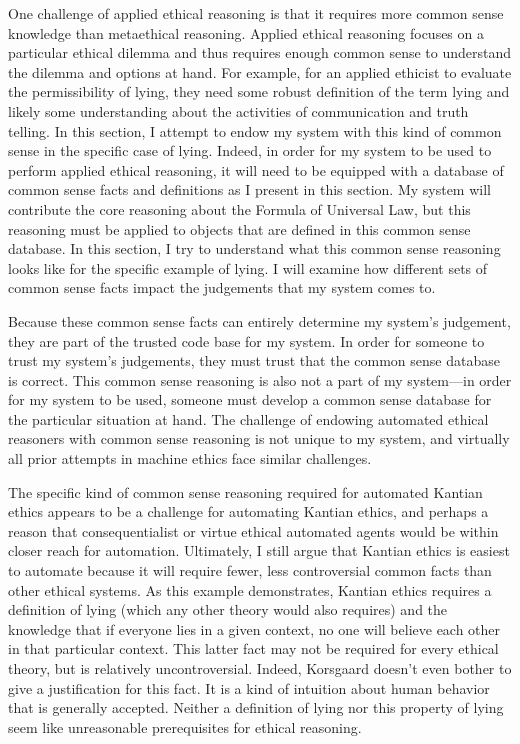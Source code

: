 \begin{isabellebody}
\begin{isamarkuptext}
One challenge of applied ethical reasoning is that it requires more common sense knowledge than metaethical
reasoning. Applied ethical reasoning focuses on a particular ethical dilemma and thus requires enough 
common sense to understand the dilemma and options at hand. For example, for an applied ethicist to 
evaluate the permissibility of lying, they need some robust definition of the term lying and likely some
understanding about the activities of communication and truth telling. In this section, I attempt to
endow my system with this kind of common sense in the specific case of lying. Indeed, in order for my 
system to be used to perform applied ethical reasoning, it will need to be equipped with a database
of common sense facts and definitions as I present in this section. My system will contribute the core
reasoning about the Formula of Universal Law, but this reasoning must be applied to objects that are defined
in this common sense database. In this section, I try to understand what this common sense reasoning looks like
for the specific example of lying. I will examine how different sets of common sense facts impact the 
judgements that my system comes to. 

Because these common sense facts can entirely determine my system's judgement, they are part of the trusted
code base for my system. In order for someone to trust my system's judgements, they must trust that the
common sense database is correct. This common sense reasoning is also not a part of my system—in order for my
system to be used, someone must develop a common sense database for the particular situation at hand. 
The challenge of endowing automated ethical reasoners with common sense reasoning is not unique to my 
system, and virtually all prior attempts in machine ethics face similar challenges.

The specific kind of common sense reasoning required for automated Kantian ethics appears to be a challenge 
for automating Kantian ethics, and perhaps a reason that consequentialist or virtue ethical automated
agents would be within closer reach for automation. Ultimately, I still argue that Kantian ethics is 
easiest to automate because it will require fewer, less controversial common facts than other ethical
systems. As this example demonstrates, Kantian ethics requires a definition of lying (which any other 
theory would also requires) and the knowledge that if everyone lies in a given context, no one will believe 
each other in that particular context. This latter fact may not be required for every ethical theory, 
but is relatively uncontroversial. Indeed, Korsgaard doesn't even bother to give a justification for 
this fact. It is a kind of intuition about human behavior that is generally accepted. Neither a definition 
of lying nor this property of lying seem like unreasonable prerequisites for ethical reasoning. 


\end{isamarkuptext}
\end{isabellebody}
